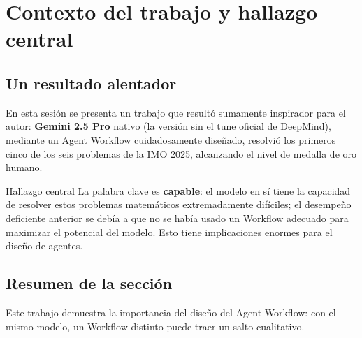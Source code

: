 \section{Contexto del trabajo y hallazgo central}

\subsection{Un resultado alentador}

En esta sesión se presenta un trabajo que resultó sumamente inspirador para el autor: \textbf{Gemini 2.5 Pro} nativo (la versión sin el tune oficial de DeepMind), mediante un Agent Workflow cuidadosamente diseñado, resolvió los primeros cinco de los seis problemas de la IMO 2025, alcanzando el nivel de medalla de oro humano.

\begin{importantbox}{Hallazgo central}
La palabra clave es \textbf{capable}: el modelo en sí tiene la capacidad de resolver estos problemas matemáticos extremadamente difíciles; el desempeño deficiente anterior se debía a que no se había usado un Workflow adecuado para maximizar el potencial del modelo. Esto tiene implicaciones enormes para el diseño de agentes.
\end{importantbox}

\subsection{Resumen de la sección}

Este trabajo demuestra la importancia del diseño del Agent Workflow: con el mismo modelo, un Workflow distinto puede traer un salto cualitativo.

